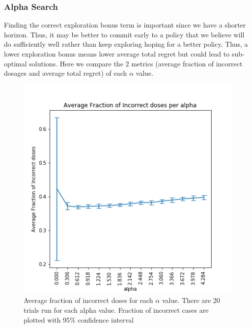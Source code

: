 \documentclass{article}
\begin{document}
\subsubsection{Alpha Search}
\label{alpha_search}
Finding the correct exploration bonus term is important since we have a shorter horizon. Thus, it may be better to commit early to a policy that we believe will do sufficiently well rather than keep exploring hoping for a better policy. Thus, a lower exploration bonus means lower average total regret but could lead to sub-optimal solutions. Here we compare the 2 metrics (average fraction of incorrect dosages and average total regret) of each $\alpha$ value. 
\begin{figure}
	\includegraphics[width=\linewidth]{../plots/avg_frac_incorrect_alpha.png}
	\caption{Average fraction of incorrect doses for each $\alpha$ value. There are 20 trials run for each alpha value. Fraction of incorrect cases are plotted with 95\% confidence interval}
	\label{fig:avg_frac_incorrect_alpha}
\end{figure}
\end{document}
